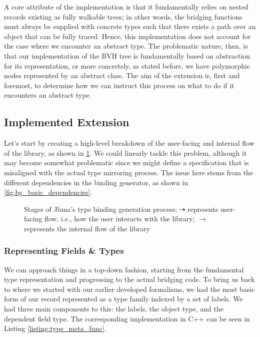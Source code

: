 A core attribute of the implementation is that it fundamentally relies on nested records existing as fully walkable trees; in other words, the bridging functions must always be supplied with concrete types such that there exists a path over an object that can be fully traced. Hence, this implementation does not account for the case where we encounter an abstract type. The problematic nature, then, is that our implementation of the BVH tree is fundamentally based on abstraction for its representation, or more concretely, as stated before, we have polymorphic nodes represented by an abstract class. The aim of the extension is, first and foremost, to determine how we can instruct this process on what to do if it encounters an abstract type. 

\subsection{Implemented Extension}

Let's start by creating a high-level breakdown of the user-facing and internal flow of the library, as shown in \ref{fig:jluna_stages}. We could linearly tackle this problem, although it may become somewhat problematic since we might define a specification that is misaligned with the actual type mirroring process. The issue here stems from the different dependencies in the binding generator, as shown in \ref{fig:bg_basic_dependencies}. 

\begin{figure}[ht!]
  \centering
  
  \caption{Stages of Jluna's type binding generation process; $\dashrightarrow$ represents user-facing flow, i.e., how the user interacts with the library; $\rightarrow$ represents the internal flow of the library}
  \label{fig:jluna_stages}
  \Description{}
\end{figure}

\subsubsection{Representing Fields \& Types}

We can approach things in a top-down fashion, starting from the fundamental type representation and progressing to the actual bridging code. To bring us back to where we started with our earlier developed formalisms, we had the most basic form of our record represented as a type family indexed by a set of labels. We had three main components to this: the labels, the object type, and the dependent field type. The corresponding implementation in C++ can be seen in Listing \ref{listing:type_meta_func}.

